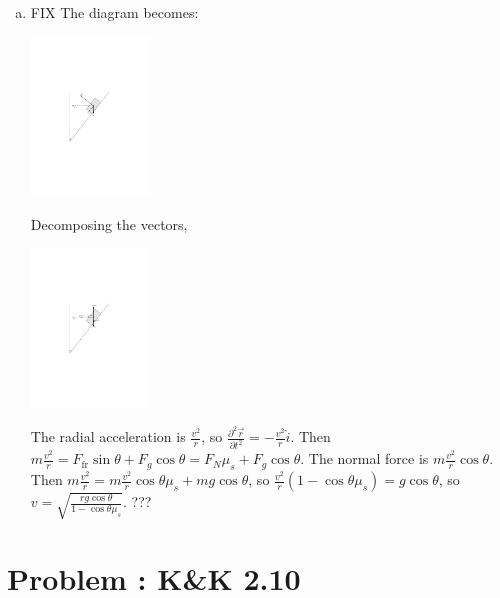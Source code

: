 \documentclass[solutions]{esg8012pset}
\begin{document}
\begin{enumerate}[a)]
    \item FIX The diagram becomes: \begin{center}\includegraphics[width=0.25\textwidth]{2009-09-25_Diagram_8}\end{center}  Decomposing the vectors, \begin{center}\includegraphics[width=0.25\textwidth]{2009-09-25_Diagram_9}\end{center}  The radial acceleration is $\frac{v^2}{r}$, so $\frac{\partial^2 \vec r}{\partial t^2} = -\frac{v^2}{r}\hat i$.  Then $m\frac{v^2}{r} = F_{\text{fr}}\sin\theta + F_g\cos\theta = F_N \mu_s + F_g\cos\theta$.  The normal force is $m\frac{v^2}{r}\cos\theta$.  Then $m\frac{v^2}{r} = m\frac{v^2}{r}\cos\theta \mu_s + mg\cos\theta$, so $\frac{v^2}{r}(1 - \cos\theta \mu_s) = g\cos\theta$, so $v = \sqrt{\frac{rg\cos\theta}{1-\cos\theta\mu_s}}$. ???
  \end{enumerate}

  \noindent
\section{Problem \thesection: K\&K 2.10}
\end{document}
